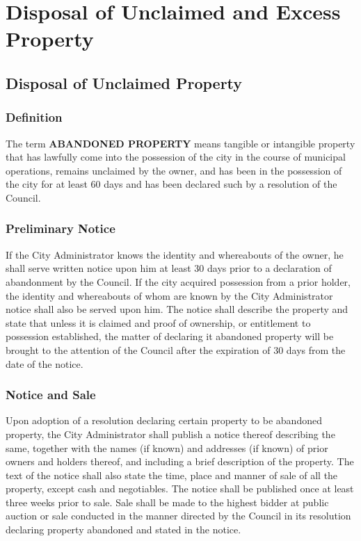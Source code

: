 \section{Disposal of Unclaimed and Excess Property}
\subsection{Disposal of Unclaimed Property}
\subsubsection{Definition}
The term \textbf{ABANDONED PROPERTY} means tangible or intangible property that has lawfully come into the possession of the city in the course of municipal operations, remains unclaimed by the owner, and has been in the possession of the city for at least 60 days and has been declared such by a resolution of the Council.
\subsubsection{Preliminary Notice}
If the City Administrator knows the identity and whereabouts of the owner, he shall serve written notice upon him at least 30 days prior to a declaration of abandonment by the Council.  If the city acquired possession from a prior holder, the identity and whereabouts of whom are known by the City Administrator notice shall also be served upon him. The notice shall describe the property and state that unless it is claimed and proof of ownership, or entitlement to possession established, the matter of declaring it abandoned property will be brought to the attention of the Council after the expiration of 30 days from the date of the notice.
\subsubsection{Notice and Sale}
Upon adoption of a resolution declaring certain property to be abandoned property, the City Administrator shall publish a notice thereof describing the same, together with the names (if known) and addresses (if known) of prior owners and holders thereof, and including a brief description of the property. The text of the notice shall also state the time, place and manner of sale of all the property, except cash and negotiables. The notice shall be published once at least three weeks prior to sale. Sale shall be made to the highest bidder at public auction or sale conducted in the manner directed by the Council in its resolution declaring property abandoned and stated in the notice.
